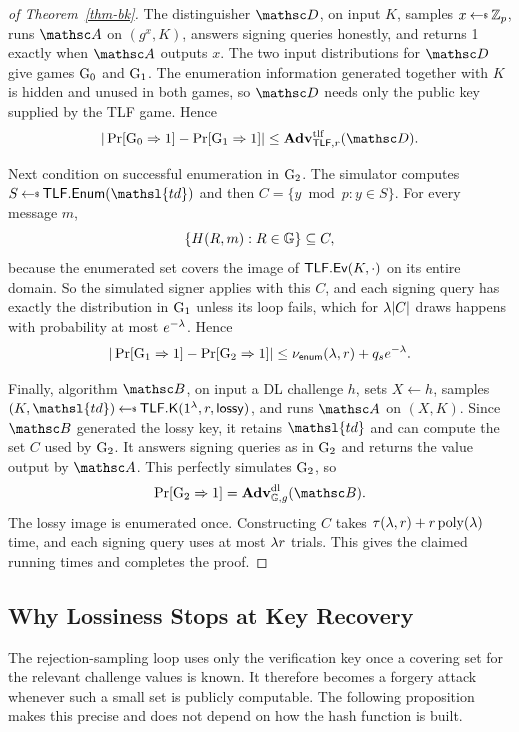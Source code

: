 \begin{proof}[of Theorem~\ref{thm-bk}]
The distinguisher $\advD$, on input $K$, samples $x\getsr\Zp$, runs $\advA$ on
$(g^x,K)$, answers signing queries honestly, and returns 1 exactly when $\advA$
outputs $x$. The
two input distributions for $\advD$ give games $\textnormal{G}_0$ and $\textnormal{G}_1$. The
enumeration information generated together with $K$ is hidden and unused in
both games, so $\advD$ needs only the public key supplied by the TLF game. Hence
$$
|\Pr[\Gm_0\Rightarrow1]-\Pr[\Gm_1\Rightarrow1]|
\le\AdvTLF{\TLF,r}{\advD}.
$$

Next condition on successful enumeration in $\textnormal{G}_2$. The simulator computes
$S\getsr\TLFEnum(\mathsl{td})$ and then $C=\{y\bmod p:y\in S\}$. For every message
$m$,
$$
\{H(R,m):R\in\mathbb{G}\}\subseteq C,
$$
because the enumerated set covers the image of $\mathsf{TLF}.\mathsf{Ev}(K,\cdot)$ on its entire
domain. So the simulated signer applies with this $C$, and each signing query
has exactly the distribution in $\textnormal{G}_1$ unless its loop fails, which for
$\lambda|C|$ draws happens with probability at most $e^{-\lambda}$. Hence
$$
|\Pr[\textnormal{G}_1\Rightarrow1]-\Pr[\textnormal{G}_2\Rightarrow1]|
\le\nu_{\mathsf{enum}}(\lambda,r)+q_se^{-\lambda}.
$$

Finally, algorithm $\advB$, on input a DL challenge $h$, sets $X\gets h$, samples
$(K,\mathsl{td})\getsr\TLFKg(\usecp,r,\mathsf{lossy})$, and runs $\advA$ on
$(X,K)$. Since $\advB$ generated the lossy key, it retains
$\mathsl{td}$ and can compute the set $C$ used by $\textnormal{G}_2$. It answers signing
queries as in $\textnormal{G}_2$ and returns the value output by $\advA$. This perfectly
simulates $\textnormal{G}_2$, so
$$
\Pr[\Gm_2\Rightarrow1]=\AdvDL{\GG,g}{\advB}.
$$
The lossy image is enumerated once. Constructing $C$ takes
$\tau(\lambda,r)+r\mathop{\rm poly}\nolimits(\lambda)$ time, and each signing query uses at most
$\lambda r$ trials. This gives the claimed running times and completes the proof.
\end{proof}

\subsection{Why Lossiness Stops at Key Recovery}

The rejection-sampling loop uses only the verification key once a covering set
for the relevant challenge values is known. It therefore becomes a forgery
attack whenever such a small set is publicly computable. The following
proposition makes this precise and does not depend on how the hash function is
built.

